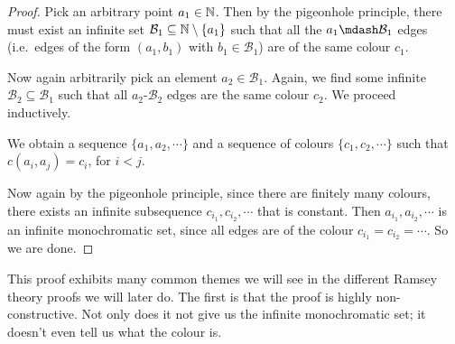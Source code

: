 \documentclass[a4paper]{article}
\begin{document}
\begin{proof}
  Pick an arbitrary point $a_1 \in \mathbb{N}$. Then by the pigeonhole principle, there must exist an infinite set $\mathcal{B}_1 \subseteq \mathbb{N} \setminus \{a_1\}$ such that all the $a_1\mdash \mathcal{B}_1$ edges (i.e.\ edges of the form $(a_1, b_1)$ with $b_1 \in \mathcal{B}_1$) are of the same colour $c_1$.

  Now again arbitrarily pick an element $a_2 \in \mathcal{B}_1$. Again, we find some infinite $\mathcal{B}_2 \subseteq \mathcal{B}_1$ such that all $a_2$-$\mathcal{B}_2$ edges are the same colour $c_2$. We proceed inductively.
  \begin{center}
  \end{center}
  We obtain a sequence $\{a_1, a_2, \cdots\}$ and a sequence of colours $\{c_1, c_2, \cdots\}$ such that $c(a_i, a_j) = c_i$, for $i < j$.

  Now again by the pigeonhole principle, since there are finitely many colours, there exists an infinite subsequence $c_{i_1}, c_{i_2}, \cdots$ that is constant. Then $a_{i_1}, a_{i_2}, \cdots$ is an infinite monochromatic set, since all edges are of the colour $c_{i_1} = c_{i_2} = \cdots$. So we are done.
\end{proof}
This proof exhibits many common themes we will see in the different Ramsey theory proofs we will later do. The first is that the proof is highly non-constructive. Not only does it not give us the infinite monochromatic set; it doesn't even tell us what the colour is.
\end{document}
